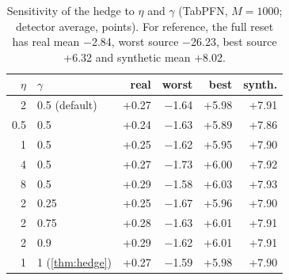 \begin{table}[t]
\centering
\caption{Sensitivity of the hedge to $\eta$ and $\gamma$ (TabPFN, $M=1000$; detector average, points). For reference,
the full reset has real mean $-$2.84, worst source $-$26.23, best source +6.32 and synthetic mean +8.02.}
\label{tab:hsens}
\small
\begin{tabular}{rl rrrr}
\toprule
$\eta$ & $\gamma$ & real & worst & best & synth. \\
\midrule
2 & 0.5 (default) & +0.27 & $-$1.64 & +5.98 & +7.91 \\
0.5 & 0.5 & +0.24 & $-$1.63 & +5.89 & +7.86 \\
1 & 0.5 & +0.25 & $-$1.62 & +5.95 & +7.90 \\
4 & 0.5 & +0.27 & $-$1.73 & +6.00 & +7.92 \\
8 & 0.5 & +0.29 & $-$1.58 & +6.03 & +7.93 \\
2 & 0.25 & +0.25 & $-$1.67 & +5.96 & +7.90 \\
2 & 0.75 & +0.28 & $-$1.63 & +6.01 & +7.91 \\
2 & 0.9 & +0.29 & $-$1.62 & +6.01 & +7.91 \\
1 & 1 (\cref{thm:hedge}) & +0.27 & $-$1.59 & +5.98 & +7.90 \\
\bottomrule
\end{tabular}
\end{table}
